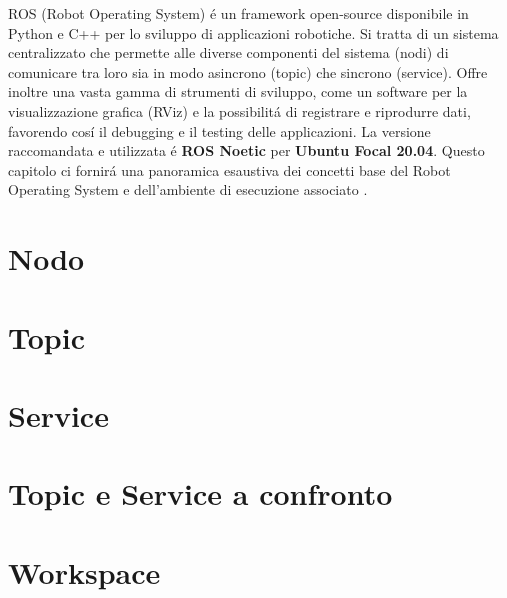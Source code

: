 ROS (Robot Operating System) \'{e} un framework open-source disponibile in Python e C++ per lo sviluppo di applicazioni robotiche. 
Si tratta di un sistema centralizzato che permette alle diverse componenti del sistema (nodi) di comunicare tra loro sia in modo
asincrono (topic) che sincrono (service). Offre inoltre una vasta gamma di strumenti di sviluppo, come un software per la 
visualizzazione grafica (RViz) e la possibilit\'{a} di registrare e riprodurre dati, favorendo cos\'{i} il debugging e il testing 
delle applicazioni. 
La versione raccomandata e utilizzata \'{e} \textbf{ROS Noetic} per \textbf{Ubuntu Focal 20.04}. 
Questo capitolo ci fornir\'{a} una panoramica esaustiva dei concetti base del Robot Operating System e dell'ambiente di esecuzione 
associato \cite{ros_tutorial}.

\section{Nodo}


\section{Topic}


\section{Service}


\section{Topic e Service a confronto}


\section{Workspace}
